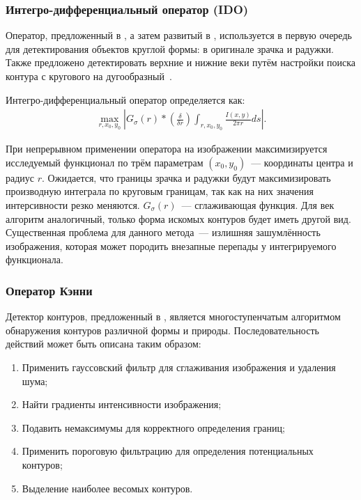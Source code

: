 \documentclass[12pt,a4paper]{article} %
\begin{document}
\subsubsection{Интегро-дифференциальный оператор (IDO)}

Оператор, предложенный в \cite{Daugman2}, а затем развитый в \cite{Daugman4, Daugman}, используется в первую очередь для детектирования объектов круглой формы: в оригинале зрачка и радужки. Также предложено детектировать верхние и нижние веки путём настройки поиска контура с кругового на дугообразный~\cite{Daugman}.

Интегро-дифференциальный оператор определяется как:
\begin{gather}\label{ido}
	\max_{r, x_0, y_0}{\left| G_\sigma(r)*\left(\frac{\delta}{\delta r}\right)\int_{r, x_0, y_0}{\frac{I(x,y)}{2\pi r}ds}\right|}.
\end{gather}

При непрерывном применении оператора на изображении максимизируется исследуемый функционал по трём параметрам $(x_0, y_0)$~--- координаты центра и радиус $r$. Ожидается, что границы зрачка и радужки будут максимизировать производную интеграла по круговым границам, так как на них значения интерсивности резко меняются. $G_\sigma(r)$~--- сглаживающая функция. Для век алгоритм аналогичный, только форма искомых контуров будет иметь другой вид. Существенная проблема для данного метода~--- излишняя зашумлённость изображения, которая может породить внезапные перепады у интегрируемого функционала.


\subsubsection{Оператор Кэнни}

Детектор контуров, предложенный в \cite{Canny}, является многоступенчатым алгоритмом обнаружения контуров различной формы и природы. Последовательность действий может быть описана таким образом:

\begin{enumerate}
	\item Применить гауссовский фильтр для сглаживания изображения и удаления шума;
	\item Найти градиенты интенсивности изображения;
	\item Подавить немаксимумы для корректного определения границ;
	\item Применить пороговую фильтрацию для определения потенциальных контуров;
	\item Выделение наиболее весомых контуров.
\end{enumerate}
\end{document}
